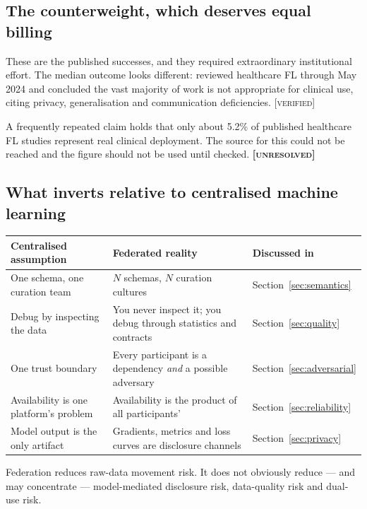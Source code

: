 \documentclass[11pt,a4paper]{article}
\newcommand{\flag}[1]{\textcolor{flagcolor}{\textbf{#1}}}
\newcommand{\verified}{\textsc{[verified]}}
\newcommand{\unresolved}{\flag{\textsc{[unresolved]}}}
\begin{document}
\subsection{The counterweight, which deserves equal billing}

These are the published successes, and they required extraordinary
institutional effort. The median outcome looks different:
\citet{li2024challenges} reviewed healthcare FL through May 2024 and
concluded the vast majority of work is not appropriate for clinical use,
citing privacy, generalisation and communication deficiencies. \verified

A frequently repeated claim holds that only about 5.2\% of published
healthcare FL studies represent real clinical deployment. The source for
this could not be reached and the figure should not be used until checked.
\unresolved

\subsection{What inverts relative to centralised machine learning}

\begin{center}
\begin{tabular}{L{0.30\textwidth} L{0.32\textwidth} L{0.26\textwidth}}
\toprule
\textbf{Centralised assumption} & \textbf{Federated reality} &
\textbf{Discussed in} \\
\midrule
One schema, one curation team & $N$ schemas, $N$ curation cultures &
Section~\ref{sec:semantics} \\
Debug by inspecting the data & You never inspect it; you debug through
statistics and contracts & Section~\ref{sec:quality} \\
One trust boundary & Every participant is a dependency \emph{and} a
possible adversary & Section~\ref{sec:adversarial} \\
Availability is one platform's problem & Availability is the product of all
participants' & Section~\ref{sec:reliability} \\
Model output is the only artifact & Gradients, metrics and loss curves are
disclosure channels & Section~\ref{sec:privacy} \\
\bottomrule
\end{tabular}
\end{center}

Federation reduces raw-data movement risk. It does not obviously reduce ---
and may concentrate --- model-mediated disclosure risk, data-quality risk
and dual-use risk.
\end{document}
